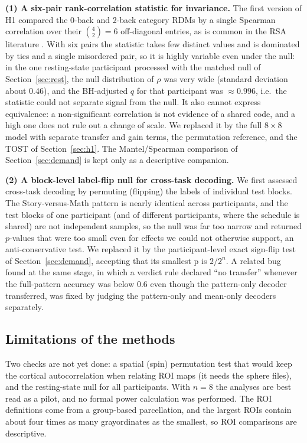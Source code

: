\documentclass[conference]{IEEEtran}
\newcommand{\Nsub}{8}
\begin{document}
\textbf{(1) A six-pair rank-correlation statistic for invariance.} The first version of H1 compared the 0-back and 2-back category RDMs by a single Spearman correlation over their $\binom{4}{2}=6$ off-diagonal entries, as is common in the RSA literature \cite{kriegeskorte2008,nili2014}. With six pairs the statistic takes few distinct values and is dominated by ties and a single misordered pair, so it is highly variable even under the null: in the one resting-state participant processed with the matched null of Section~\ref{sec:rest}, the null distribution of $\rho$ was very wide (standard deviation about 0.46), and the BH-adjusted $q$ for that participant was $\approx0.996$, i.e.\ the statistic could not separate signal from the null. It also cannot express equivalence: a non-significant correlation is not evidence of a shared code, and a high one does not rule out a change of scale. We replaced it by the full $8\times8$ model with separate transfer and gain terms, the permutation reference, and the TOST of Section~\ref{sec:h1}. The Mantel/Spearman comparison of Section~\ref{sec:demand} is kept only as a descriptive companion.

\textbf{(2) A block-level label-flip null for cross-task decoding.} We first assessed cross-task decoding by permuting (flipping) the labels of individual test blocks. The Story-versus-Math pattern is nearly identical across participants, and the test blocks of one participant (and of different participants, where the schedule is shared) are not independent samples, so the null was far too narrow and returned $p$-values that were too small even for effects we could not otherwise support, an anti-conservative test. We replaced it by the participant-level exact sign-flip test of Section~\ref{sec:demand}, accepting that its smallest p is $2/2^n$. A related bug found at the same stage, in which a verdict rule declared ``no transfer'' whenever the full-pattern accuracy was below 0.6 even though the pattern-only decoder transferred, was fixed by judging the pattern-only and mean-only decoders separately.

\subsection{Limitations of the methods}
Two checks are not yet done: a spatial (spin) permutation test that would keep the cortical autocorrelation when relating ROI maps (it needs the sphere files), and the resting-state null for all participants. With $n=\Nsub$ the analyses are best read as a pilot, and no formal power calculation was performed. The ROI definitions come from a group-based parcellation, and the largest ROIs contain about four times as many grayordinates as the smallest, so ROI comparisons are descriptive.
\end{document}
